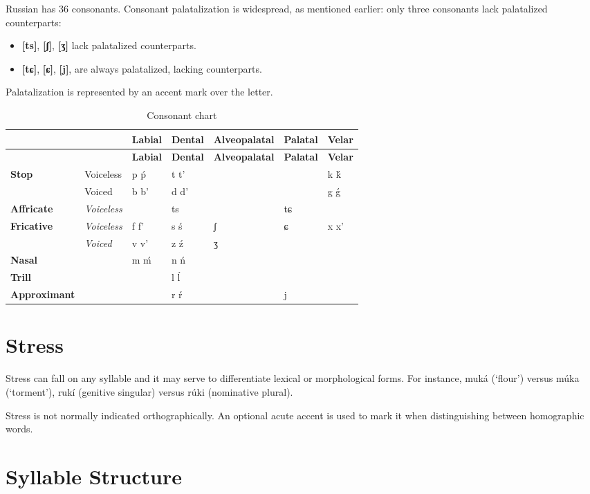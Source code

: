 \documentclass[
  a4paperpaper,
]{report}
\providecommand{\tightlist}{%
  \setlength{\itemsep}{0pt}\setlength{\parskip}{0pt}}
\begin{document}
Russian has 36 consonants. Consonant palatalization is widespread, as
mentioned earlier: only three consonants lack palatalized counterparts:

\begin{itemize}
\tightlist
\item
  \textbf{{[}ts{]}}, \textbf{{[}ʃ{]}}, \textbf{{[}ʒ{]}} lack palatalized
  counterparts.
\item
  \textbf{{[}tɕ{]}}, \textbf{{[}ɕ{]}}, \textbf{{[}j{]}}, are always
  palatalized, lacking counterparts.
\end{itemize}

Palatalization is represented by an accent mark over the letter.

\begin{longtable}[]{@{}lllllll@{}}
\caption{Consonant chart}\tabularnewline
\toprule
& & \textbf{Labial} & \textbf{Dental} & \textbf{Alveopalatal} &
\textbf{Palatal} & \textbf{Velar}\tabularnewline
\midrule
\endfirsthead
\toprule
& & \textbf{Labial} & \textbf{Dental} & \textbf{Alveopalatal} &
\textbf{Palatal} & \textbf{Velar}\tabularnewline
\midrule
\endhead
\textbf{Stop} & Voiceless & p ṕ & t t' & & & k ḱ\tabularnewline
& Voiced & b b' & d d' & & & g ǵ\tabularnewline
\textbf{Affricate} & \emph{Voiceless} & & ts & & tɕ &\tabularnewline
\textbf{Fricative} & \emph{Voiceless} & f f' & s ś & ʃ & ɕ & x
x'\tabularnewline
& \emph{Voiced} & v v' & z ź & ʒ & &\tabularnewline
\textbf{Nasal} & & m ḿ & n ń & & &\tabularnewline
\textbf{Trill} & & & l ĺ & & &\tabularnewline
\textbf{Approximant} & & & r ŕ & & j &\tabularnewline
\bottomrule
\end{longtable}

\hypertarget{stress}{%
\section{Stress}\label{stress}}

Stress can fall on any syllable and it may serve to differentiate
lexical or morphological forms. For instance, muká (`flour') versus múka
(`torment'), rukí (genitive singular) versus rúki (nominative plural).

Stress is not normally indicated orthographically. An optional acute
accent is used to mark it when distinguishing between homographic words.

\hypertarget{syllable-structure}{%
\section{Syllable Structure}\label{syllable-structure}}
\end{document}
